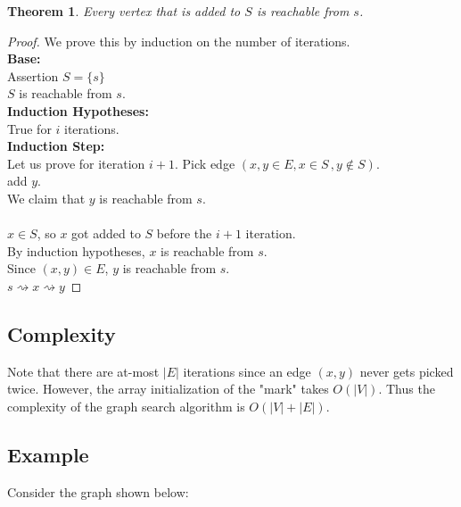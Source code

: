 \documentclass{article}
\begin{document}
\newtheorem{thm}{Theorem}
\begin{thm}
Every vertex that is added to $S$ is reachable from $s$.
\end{thm}
\begin{proof}
We prove this by induction on the number of iterations.\\
\textbf{Base:}\\
 Assertion $S = \{s\}$\\
$S$ is reachable from $s$.\\
\textbf{Induction Hypotheses:}\\ 
True for $i$ iterations.\\
\textbf{Induction Step:}\\
Let us prove for iteration $i+1$.
Pick edge $(x,y \in E, x\in S\,,y\notin S)$.\\
add $y$.\\
We claim that $y$ is reachable from $s$.\\
\\
$x\in S$, so $x$ got added to $S$ before the $i+1$ iteration.\\
By induction hypotheses, $x$ is reachable from $s$.\\
Since $(x,y) \in E$, $y$ is reachable from $s$.\\
$s \rightsquigarrow x \rightsquigarrow y$

\end{proof}


\subsection{Complexity}
Note that there are at-most $|E|$ iterations since an edge $(x,y)$ never gets picked twice. However, the array initialization of the "mark"  takes $O(|V|)$.  Thus the complexity of the graph search algorithm is $O(|V|+|E|)$.

\subsection{Example}

Consider the graph shown below:\\

\end{document}
